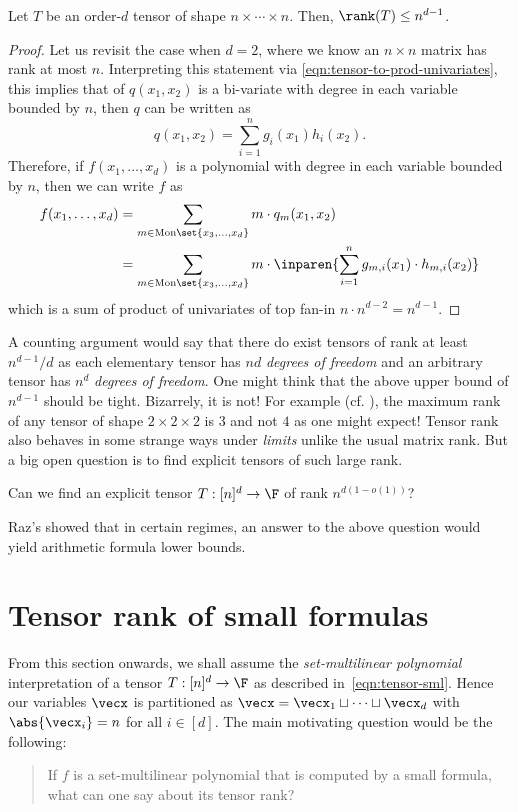 \begin{lemma}\label{lem:tensor-rank-trivial-upperbound}
  Let $T$ be an order-$d$ tensor of shape $n\times \cdots \times n$.
Then, $\rank(T) \leq n^{d-1}$.
\end{lemma}
\begin{proof}
  Let us revisit the case when $d=2$, where we know an $n\times n$ matrix has rank at most $n$.
Interpreting this statement via \eqref{eqn:tensor-to-prod-univariates}, this implies that of $q(x_1,x_2)$ is a bi-variate with degree in each variable bounded by $n$, then $q$ can be written as
\[
q(x_1,x_2) = \sum_{i=1}^n g_i(x_1) h_i(x_2).
\]
Therefore, if $f(x_1,\ldots, x_d)$ is a polynomial with degree in each variable bounded by $n$, then we can write $f$ as
\begin{align*}
f(x_1,\ldots, x_d) &= \sum_{m \in \mathrm{Mon}\set{x_3,\ldots, x_d}} m \cdot q_m(x_1,x_2)\\
& = \sum_{m \in \mathrm{Mon}\set{x_3,\ldots, x_d}} m \cdot \inparen{\sum_{i=1}^n g_{m,i}(x_1) \cdot h_{m,i}(x_2)}
\end{align*}
which is a sum of product of univariates of top fan-in $n \cdot n^{d-2} = n^{d-1}$. 
\end{proof}

A counting argument would say that there do exist tensors of rank at least $n^{d-1}/d$ as each elementary tensor has $nd$ \emph{degrees of freedom} and an arbitrary tensor has $n^d$ \emph{degrees of freedom}.
One might think that the above upper bound of $n^{d-1}$ should be tight.
Bizarrely, it is not!
For example (cf.
\cite{p85}), the maximum rank of any tensor of shape $2\times 2 \times 2$ is $3$ and not $4$ as one might expect!
Tensor rank also behaves in some strange ways under \emph{limits} unlike the usual matrix rank.
But a big open question is to find explicit tensors of such large rank.

\begin{openproblem}
Can we find an explicit tensor $T: [n]^d \rightarrow \F$ of rank $n^{d(1 - o(1))}$?
\end{openproblem}

Raz's \cite{raz10} showed that in certain regimes, an answer to the above question would yield arithmetic formula lower bounds. 

\section{Tensor rank of small formulas}

From this section onwards, we shall assume the \emph{set-multilinear polynomial} interpretation of a tensor $T:[n]^d \rightarrow \F$ as described in~\eqref{eqn:tensor-sml}.
Hence our variables $\vecx$ is partitioned as $\vecx = \vecx_1 \sqcup \cdots \sqcup \vecx_d$ with $\abs{\vecx_i} = n$ for all $i\in [d]$.
The main motivating question would be the following:
\begin{quote}
If $f$ is a set-multilinear polynomial that is computed by a small formula, what can one say about its tensor rank?
\end{quote}

